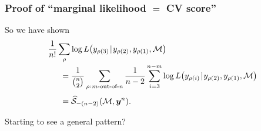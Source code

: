 \documentclass[18pt, handout]{beamer}
\newcommand{\given}{\thinnerspace | \thinnerspace}
\newcommand{\spacedColon}{\mkern .5mu : \mkern 1mu}
\newcommand{\thinnerspace}{\mskip.5\thinmuskip}
\newcommand{\likelihood}{L}
\newcommand{\by}{\bm{y}}
\newcommand{\score}{\mathcal{S}}
\newcommand{\modelSymbol}{\mathcal{M}}
\newcommand{\permutation}{\rho}
\newcommand{\trainingSize}{m}
\newcommand{\testSampleIndex}{i}
\begin{document}
\begin{frame}
\frametitle{Proof of ``marginal likelihood $=$ {\large CV} score''}
So we have shown
\begin{equation*}
\setlength{\jot}{0\baselineskip}
\begin{aligned}
&\frac{1}{n!} \sum_\permutation \log \likelihood\!\left(y_{\permutation(3)} \given y_{\permutation(2)}, y_{\permutation(1)}, \modelSymbol \right) \\
	&\hspace*{1.5em}= \frac{1}{{n \choose 2}} \sum_{\permutation \spacedColon \text{$\trainingSize$-out-of-$n$}}
		\frac{1}{n - 2} \sum_{\testSampleIndex = 3}^{n - \trainingSize} \log \likelihood\!\left(y_{\permutation(\testSampleIndex)} \given y_{\permutation(2)}, y_{\permutation(1)}, \modelSymbol \right) \\[.5\baselineskip]
	&\hspace*{1.5em}= \widehat{\score}_{-(n - 2)}(\modelSymbol, \by^n).
\end{aligned}
\end{equation*}

Starting to see a general pattern?
\end{frame}
\end{document}

